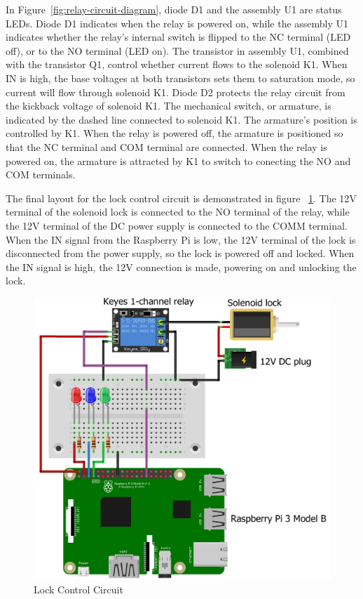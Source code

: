 \documentclass[12pt]{report}
\begin{document}
In Figure~\ref{fig:relay-circuit-diagram}, diode D1 and the assembly U1 are status LEDs. Diode D1 indicates when the 
relay is powered on, while the assembly U1 indicates whether the relay's internal switch is flipped to the NC terminal 
(LED off), or to the NO terminal (LED on). The transistor in assembly U1, combined with the transistor Q1, control 
whether current flows to the solenoid K1. When IN is high, the base voltages at both transistors sets them to 
saturation mode, so current will flow through solenoid K1. Diode D2 protects the relay circuit from the kickback 
voltage of solenoid K1. The mechanical switch, or armature, is indicated by the dashed line connected to solenoid K1. 
The armature's position is controlled by K1. When the relay is powered off, the armature is positioned so that the NC 
terminal and COM terminal are connected. When the relay is powered on, the armature is attracted by K1 to switch to 
conecting the NO and COM terminals.

The final layout for the lock control circuit is demonstrated in figure ~\ref{fig:lock-control-circuit-diagram}. The 
12V terminal of the solenoid lock is connected to the NO terminal of the relay, while the 12V terminal of the DC power 
supply is connected to the COMM terminal. When the IN signal from the Raspberry Pi is low, the 12V terminal of the lock 
is disconnected from the power supply, so the lock is powered off and locked. When the IN signal is high, the 12V 
connection is made, powering on and unlocking the lock.

\begin{figure}
    \includegraphics[width=\textwidth]{Diagrams/Hardware-Diagrams/hardware_lock_control}
    \caption{Lock Control Circuit}
    \label{fig:lock-control-circuit-diagram}
\end{figure}
\end{document}
